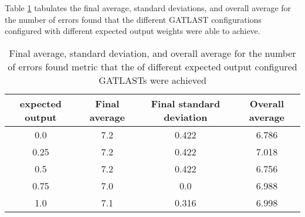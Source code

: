 Table \ref{tab:HP:GA:ExpectedOutput:number of errors found} tabulates the final average, standard deviations, and overall average for the number of errors found that the different GATLAST configurations configured with different expected output weights were able to achieve.
\begin{table}[tbh!]
\centering
\begin{adjustbox}{trim=0cm 0cm 0cm 0cm, clip=true}
\begin{tabular}{|c|c|c|c|}
\hline
expected output & Final average & Final standard deviation & Overall average\\
\hline
0.0 & 7.2 & 0.422 & 6.786\\\hline
0.25 & 7.2 & 0.422 & 7.018\\\hline
0.5 & 7.2 & 0.422 & 6.756\\\hline
0.75 & 7.0 & 0.0 & 6.988\\\hline
1.0 & 7.1 & 0.316 & 6.998\\\hline
\end{tabular}
\end{adjustbox}
\caption{Final average, standard deviation, and overall average for the number of errors found metric that the of different expected output configured GATLASTs were achieved}
\label{tab:HP:GA:ExpectedOutput:number of errors found}
\end{table}